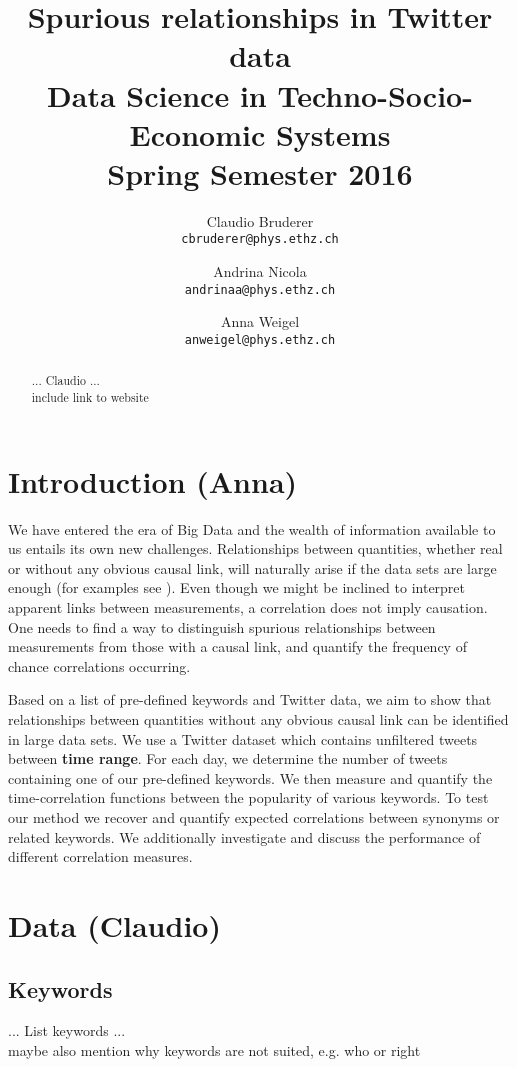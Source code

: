 \documentclass[12pt, a4paper]{article}
\author{
	Claudio Bruderer\\
	\texttt{cbruderer@phys.ethz.ch}
	\and
	Andrina Nicola\\
	\texttt{andrinaa@phys.ethz.ch}
	\and
	Anna Weigel\\
	\texttt{anweigel@phys.ethz.ch}
}
\title{Spurious relationships in Twitter data\\
	 	 \large Data Science in Techno-Socio-Economic Systems\\
	 	 \large Spring Semester 2016}
\begin{document}
\date{}
\maketitle

\begin{abstract}
... Claudio ...\\
include link to website
\end{abstract}


\vspace{0.2in}

\section{Introduction (Anna)}
We have entered the era of Big Data and the wealth of information available to us entails its own new challenges. Relationships between quantities, whether real or without any obvious causal link, will naturally arise if the data sets are large enough (for examples see \cite{tyler_vigen}). Even though we might be inclined to interpret apparent links between measurements, a correlation does not imply causation. One needs to find a way to distinguish spurious relationships between measurements from those with a causal link, and quantify the frequency of chance correlations occurring.

Based on a list of pre-defined keywords and Twitter data, we aim to show that relationships between quantities without any obvious causal link can be identified in large data sets. 
We use a Twitter dataset which contains unfiltered tweets between \textbf{time range}. For each day, we determine the number of tweets containing one of our pre-defined keywords. We then measure and quantify the time-correlation functions between the popularity of various keywords. To test our method we recover and quantify expected correlations between synonyms or related keywords. We  additionally investigate and discuss the performance of different correlation measures.

\section{Data (Claudio)}
\subsection{Keywords}
... List keywords ...\\
maybe also mention why keywords are not suited, e.g. who or right
\end{document}

